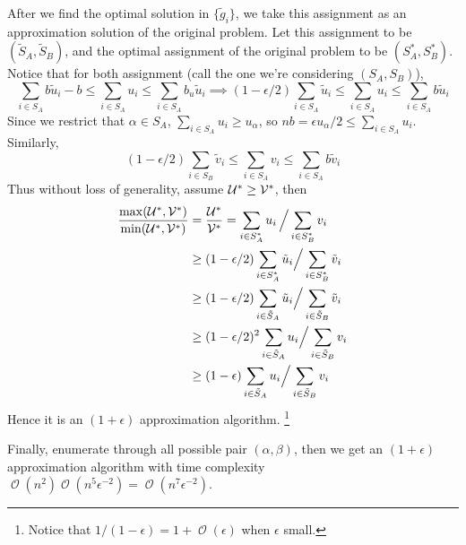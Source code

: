 \documentclass[12pt, a4paper]{article}
\DeclareMathOperator*{\ord}{\mathcal{O}}
\begin{document}
After we find the optimal solution in $\{\tilde{g}_i\}$, we take this assignment as
an approximation solution of the original problem. Let this assignment to be $(\tilde{S}_A, \tilde{S}_B)$,
and the optimal assignment of the original problem to be $(S^*_A, S^*_B)$. Notice that for both assignment
(call the one we're considering $(S_A, S_B)$),
\[ \sum_{i \in S_A} b \tilde{u}_i - b \leq \sum_{i \in S_A} u_i \leq \sum_{i \in S_A} b_u \tilde{u}_i
  \implies (1 - \epsilon/2) \sum_{i \in S_A} \tilde{u}_i \leq \sum_{i \in S_A} u_i \leq \sum_{i \in S_A} b \tilde{u}_i \]
Since we restrict that $\alpha \in S_A$, $\sum_{i \in S_A} {u}_i \geq u_\alpha$, so $nb = \epsilon u_\alpha /2
\leq \sum_{i \in S_A} u_i$. Similarly,
\[ (1 - \epsilon/2) \sum_{i \in S_B} \tilde{v}_i \leq \sum_{i \in S_A} v_i \leq \sum_{i \in S_A} b \tilde{v}_i \]
Thus without loss of generality, assume $\mathcal{U}^* \geq \mathcal{V}^*$, then
\begin{align*}
  \frac{\max(\mathcal{U}^*, \mathcal{V}^*)}{\min(\mathcal{U}^*, \mathcal{V}^*)}
  &= \frac{\mathcal{U}^*}{\mathcal{V}^*} = \sum_{i \in S^*_A} u_i\, \Big/ \sum_{i \in S^*_B} v_i \\
  &\geq (1 - \epsilon/2) \sum_{i \in S^*_A} \tilde{u}_i \Big/ \sum_{i \in S^*_B} \tilde{v}_i \\ 
  &\geq (1 - \epsilon/2) \sum_{i \in \tilde{S}_A} \tilde{u}_i \Big/ \sum_{i \in \tilde{S}_B} \tilde{v}_i \\ 
  &\geq (1 - \epsilon/2)^2 \sum_{i \in \tilde{S}_A} u_i \Big/ \sum_{i \in \tilde{S}_B} v_i \\
  &\geq (1 - \epsilon)  \sum_{i \in \tilde{S}_A} u_i \Big/ \sum_{i \in \tilde{S}_B} v_i
\end{align*}
Hence it is an $(1+\epsilon)$ approximation algorithm. \footnote{Notice that $1/(1-\epsilon) = 1 + \ord(\epsilon)$ when $\epsilon$ small.}

Finally, enumerate through all possible pair $(\alpha, \beta)$, then we get an $(1+\epsilon)$ approximation algorithm
with time complexity $\ord(n^2) \ord(n^5 \epsilon^{-2}) = \ord(n^7 \epsilon^{-2})$.

\end{document}

